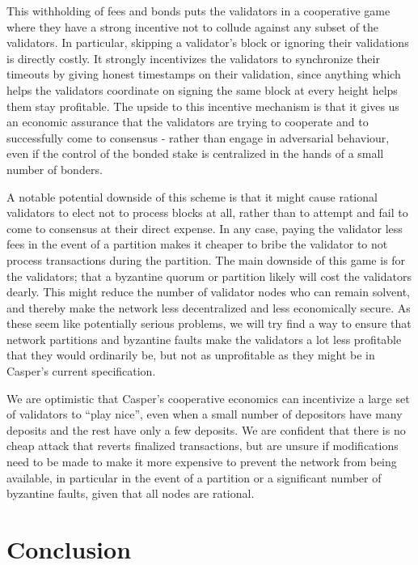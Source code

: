 \documentclass[11pt,a4paper]{article}
\begin{document}
This withholding of fees and bonds puts the validators in a cooperative game where they have a strong incentive not to collude against any subset of the validators. In particular, skipping a validator's block or ignoring their validations is directly costly. It strongly incentivizes the validators to synchronize their timeouts by giving honest timestamps on their validation, since anything which helps the validators coordinate on signing the same block at every height helps them stay profitable. The upside to this incentive mechanism is that it gives us an economic assurance that the validators are trying to cooperate and to successfully come to consensus - rather than engage in adversarial behaviour, even if the control of the bonded stake is centralized in the hands of a small number of bonders. 

A notable potential downside of this scheme is that it might cause rational validators to elect not to process blocks at all, rather than to attempt and fail to come to consensus at their direct expense. In any case, paying the validator less fees in the event of a partition makes it cheaper to bribe the validator to not process transactions during the partition. The main downside of this game is for the validators; that a byzantine quorum or partition likely will cost the validators dearly. This might reduce the number of validator nodes who can remain solvent, and thereby make the network less decentralized and less economically secure. As these seem like potentially serious problems, we will try find a way to ensure that network partitions and byzantine faults make the validators a lot less profitable that they would ordinarily be, but not as unprofitable as they might be in Casper's current specification. 

We are optimistic that Casper's cooperative economics can incentivize a large set of validators to ``play nice'', even when a small number of depositors have many deposits and the rest have only a few deposits. We are confident that there is no cheap attack that reverts finalized transactions, but are unsure if modifications need to be made to make it more expensive to prevent the network from being available, in particular in the event of a partition or a significant number of byzantine faults, given that all nodes are rational.

\section{Conclusion}
\end{document}
